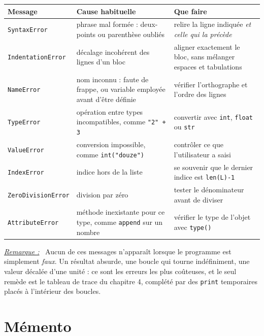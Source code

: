 \documentclass[a4paper,11pt,openany]{book}
\newcommand{\code}[1]{\texttt{\textcolor{codebleu}{#1}}}
\newenvironment{remarque}%
 {\par\vspace{1mm}\begin{list}{}{\leftmargin=1cm \rightmargin=0.5cm}\item[]%
  \textit{\underline{Remarque :}}~}%
 {\end{list}\vspace{1mm}}
\renewcommand{\arraystretch}{1.4}
\begin{document}
\begin{center}
\renewcommand{\arraystretch}{1.5}
\begin{tabular}{|l|p{5.2cm}|p{5.6cm}|}
\hline
\rowcolor{orange!50} \textbf{Message} & \textbf{Cause habituelle} & \textbf{Que faire} \\
\hline
\code{SyntaxError} & phrase mal formée : deux-points ou parenthèse oubliés & relire la ligne indiquée \emph{et celle qui la précède} \\
\hline
\code{IndentationError} & décalage incohérent des lignes d'un bloc & aligner exactement le bloc, sans mélanger espaces et tabulations \\
\hline
\code{NameError} & nom inconnu : faute de frappe, ou variable employée avant d'être définie & vérifier l'orthographe et l'ordre des lignes \\
\hline
\code{TypeError} & opération entre types incompatibles, comme \code{"2" + 3} & convertir avec \code{int}, \code{float} ou \code{str} \\
\hline
\code{ValueError} & conversion impossible, comme \code{int("douze")} & contrôler ce que l'utilisateur a saisi \\
\hline
\code{IndexError} & indice hors de la liste & se souvenir que le dernier indice est \code{len(L)-1} \\
\hline
\code{ZeroDivisionError} & division par zéro & tester le dénominateur avant de diviser \\
\hline
\code{AttributeError} & méthode inexistante pour ce type, comme \code{append} sur un nombre & vérifier le type de l'objet avec \code{type()} \\
\hline
\end{tabular}
\end{center}

\begin{remarque}
Aucun de ces messages n'apparaît lorsque le programme est simplement \emph{faux}. Un résultat absurde, une boucle qui tourne indéfiniment, une valeur décalée d'une unité : ce sont les erreurs les plus coûteuses, et le seul remède est le tableau de trace du chapitre 4, complété par des \code{print} temporaires placés à l'intérieur des boucles.
\end{remarque}

\section{Mémento}
\end{document}

